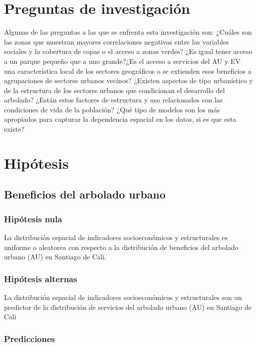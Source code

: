 \documentclass[12pt,]{book}
\begin{document}
\section{Preguntas de investigación}\label{preguntas-de-investigacion}

Algunas de las preguntas a las que se enfrenta esta investigación son:
¿Cuáles son las zonas que muestran mayores correlaciones negativas entre
las variables sociales y la cobertura de copas o el acceso a zonas
verdes? ¿Es igual tener acceso a un parque pequeño que a uno grande?¿Es
el acceso a servicios del AU y EV una característica local de los
sectores geográficos o se extienden esos beneficios a agrupaciones de
sectores urbanos vecinos? ¿Existen aspectos de tipo urbanístico y de la
estructura de los sectores urbanos que condicionan el desarrollo del
arbolado? ¿Están estos factores de estructura y uso relacionados con las
condiciones de vida de la población? ¿Qué tipo de modelos son los más
apropiados para capturar la dependencia espacial en los datos, si es que
esta existe?

\section{Hipótesis}\label{hipotesis}

\subsection{Beneficios del arbolado
urbano}\label{beneficios-del-arbolado-urbano}

\subsubsection{Hipótesis nula}\label{hipotesis-nula}

La distribución espacial de indicadores socioeconómicos y estructurales
es uniforme o aleatorea con respecto a la distribución de beneficios del
arbolado urbano (AU) en Santiago de Cali.

\subsubsection{Hipótesis alternas}\label{hipotesis-alternas}

La distribución espacial de indicadores socioeconómicos y estructurales
son un predictor de la distribución de servicios del arbolado urbano
(AU) en Santiago de Cali

\subsubsection{Predicciones}\label{predicciones}
\end{document}

